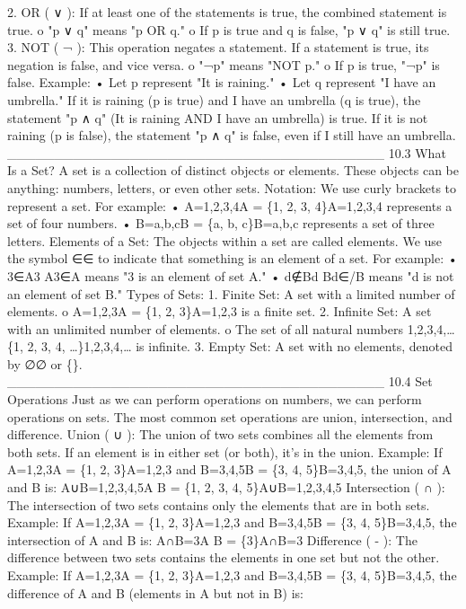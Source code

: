 2.	OR ( ∨ ): If at least one of the statements is true, the combined statement is true.
o	"p ∨ q" means "p OR q."
o	If p is true and q is false, "p ∨ q" is still true.
3.	NOT ( ¬ ): This operation negates a statement. If a statement is true, its negation is false, and vice versa.
o	"¬p" means "NOT p."
o	If p is true, "¬p" is false.
Example:
•	Let p represent "It is raining."
•	Let q represent "I have an umbrella."
If it is raining (p is true) and I have an umbrella (q is true), the statement "p ∧ q" (It is raining AND I have an umbrella) is true.
If it is not raining (p is false), the statement "p ∧ q" is false, even if I still have an umbrella.
________________________________________
10.3 What Is a Set?
A set is a collection of distinct objects or elements. These objects can be anything: numbers, letters, or even other sets.
Notation:
We use curly brackets to represent a set. For example:
•	A={1,2,3,4}A = \{1, 2, 3, 4\}A={1,2,3,4} represents a set of four numbers.
•	B={a,b,c}B = \{a, b, c\}B={a,b,c} represents a set of three letters.
Elements of a Set:
The objects within a set are called elements. We use the symbol ∈\in∈ to indicate that something is an element of a set. For example:
•	3∈A3 \in A3∈A means "3 is an element of set A."
•	d∉Bd \notin Bd∈/B means "d is not an element of set B."
Types of Sets:
1.	Finite Set: A set with a limited number of elements.
o	A={1,2,3}A = \{1, 2, 3\}A={1,2,3} is a finite set.
2.	Infinite Set: A set with an unlimited number of elements.
o	The set of all natural numbers {1,2,3,4,… }\{1, 2, 3, 4, \dots\}{1,2,3,4,…} is infinite.
3.	Empty Set: A set with no elements, denoted by ∅\emptyset∅ or {}\{\}{}.
________________________________________
10.4 Set Operations
Just as we can perform operations on numbers, we can perform operations on sets. The most common set operations are union, intersection, and difference.
Union ( ∪ ):
The union of two sets combines all the elements from both sets. If an element is in either set (or both), it’s in the union.
Example: If A={1,2,3}A = \{1, 2, 3\}A={1,2,3} and B={3,4,5}B = \{3, 4, 5\}B={3,4,5}, the union of A and B is:
A∪B={1,2,3,4,5}A \cup B = \{1, 2, 3, 4, 5\}A∪B={1,2,3,4,5}
Intersection ( ∩ ):
The intersection of two sets contains only the elements that are in both sets.
Example: If A={1,2,3}A = \{1, 2, 3\}A={1,2,3} and B={3,4,5}B = \{3, 4, 5\}B={3,4,5}, the intersection of A and B is:
A∩B={3}A \cap B = \{3\}A∩B={3}
Difference ( - ):
The difference between two sets contains the elements in one set but not the other.
Example: If A={1,2,3}A = \{1, 2, 3\}A={1,2,3} and B={3,4,5}B = \{3, 4, 5\}B={3,4,5}, the difference of A and B (elements in A but not in B) is:
